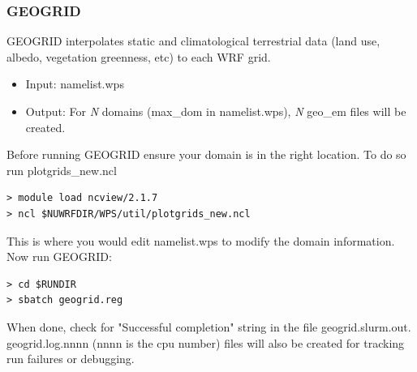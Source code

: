 \begin{frame}[fragile]\frametitle{GEOGRID}

\scriptsize{
GEOGRID interpolates static and climatological terrestrial data (land use, albedo, vegetation greenness, etc) to each WRF grid.
\begin{itemize}
\item Input: namelist.wps
\item Output: For \emph{N} domains (max\_dom in namelist.wps), \emph{N} geo\_em files will be created.
\end{itemize}\scriptsize}    
\hrulefill\par
\scriptsize{Before running GEOGRID ensure your domain is in the right location. To do so run plotgrids\_new.ncl}
\verbatimfont{\scriptsize}%
\begin{verbatim}
> module load ncview/2.1.7
> ncl $NUWRFDIR/WPS/util/plotgrids_new.ncl
\end{verbatim}
\scriptsize{This is where you would edit namelist.wps to modify the domain information.
Now run GEOGRID:}
\verbatimfont{\scriptsize}%
\begin{verbatim}
> cd $RUNDIR
> sbatch geogrid.reg
\end{verbatim}
When done, check for  "Successful completion"  string in the file geogrid.slurm.out.
geogrid.log.nnnn (nnnn is the cpu number) files will also be created for tracking run failures or debugging.


\end{frame}

